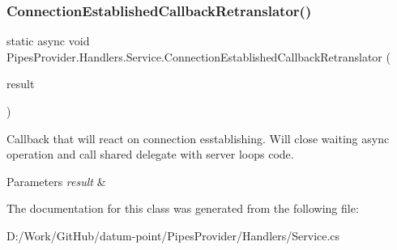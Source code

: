 \subsubsection{\texorpdfstring{Connection\+Established\+Callback\+Retranslator()}{ConnectionEstablishedCallbackRetranslator()}}
{\footnotesize\ttfamily static async void Pipes\+Provider.\+Handlers.\+Service.\+Connection\+Established\+Callback\+Retranslator (\begin{DoxyParamCaption}\item[{I\+Async\+Result}]{result }\end{DoxyParamCaption})\hspace{0.3cm}{\ttfamily [static]}}



Callback that will react on connection esstablishing. Will close waiting async operation and call shared delegate with server loop\textquotesingle{}s code. 


\begin{DoxyParams}{Parameters}
{\em result} & \\
\hline
\end{DoxyParams}


The documentation for this class was generated from the following file\+:\begin{DoxyCompactItemize}
\item 
D\+:/\+Work/\+Git\+Hub/datum-\/point/\+Pipes\+Provider/\+Handlers/Service.\+cs\end{DoxyCompactItemize}
